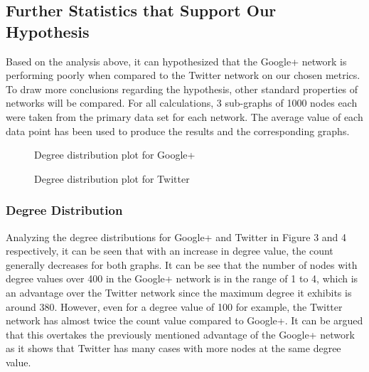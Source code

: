 \documentclass[a4paper, 10pt, conference]{ieeeconf}      %
\begin{document}
\subsection{Further Statistics that Support Our Hypothesis}

Based on the analysis above, it can hypothesized that the Google+ network is performing poorly when compared to the Twitter network on our chosen metrics. To draw more conclusions regarding the hypothesis, other standard properties of networks will be compared. For all calculations, 3 sub-graphs of 1000 nodes each were taken from the primary data set for each network. The average value of each data point has been used to produce the results and the corresponding graphs.

\begin{figure}[thpb]
      \centering
      \caption{Degree distribution plot for Google+}
      \label{figurelabel}
   \end{figure}

\begin{figure}[thpb]
      \centering
      \caption{Degree distribution plot for Twitter}
      \label{figurelabel}
   \end{figure}
   
\subsubsection{Degree Distribution}
Analyzing the degree distributions for Google+ and Twitter in Figure 3 and 4 respectively, it can be seen that with an increase in degree value, the count generally decreases for both graphs. It can be see that the number of nodes with degree values over 400 in the Google+ network is in the range of 1 to 4, which is an advantage over the Twitter network since the maximum degree it exhibits is around 380. However, even for a degree value of 100 for example, the Twitter network has almost twice the count value compared to Google+. It can be argued that this overtakes the previously mentioned advantage of the Google+ network as it shows that Twitter has many cases with more nodes at the same degree value.
\end{document}
